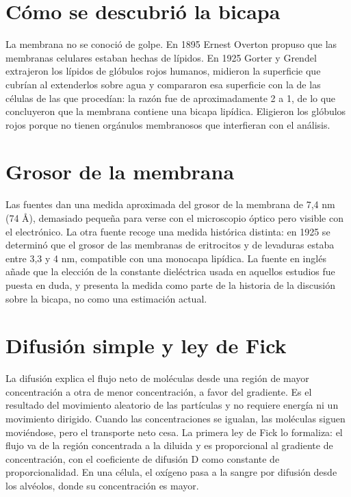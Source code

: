 \documentclass{book}
\begin{document}

\section{Cómo se descubrió la bicapa}

La membrana no se conoció de golpe. En 1895 Ernest Overton propuso que las membranas celulares estaban hechas de lípidos. En 1925 Gorter y Grendel extrajeron los lípidos de glóbulos rojos humanos, midieron la superficie que cubrían al extenderlos sobre agua y compararon esa superficie con la de las células de las que procedían: la razón fue de aproximadamente 2 a 1, de lo que concluyeron que la membrana contiene una bicapa lipídica. Eligieron los glóbulos rojos porque no tienen orgánulos membranosos que interfieran con el análisis.


\section{Grosor de la membrana}

Las fuentes dan una medida aproximada del grosor de la membrana de 7,4 nm (74 Å), demasiado pequeña para verse con el microscopio óptico pero visible con el electrónico. La otra fuente recoge una medida histórica distinta: en 1925 se determinó que el grosor de las membranas de eritrocitos y de levaduras estaba entre 3,3 y 4 nm, compatible con una monocapa lipídica. La fuente en inglés añade que la elección de la constante dieléctrica usada en aquellos estudios fue puesta en duda, y presenta la medida como parte de la historia de la discusión sobre la bicapa, no como una estimación actual.


\section{Difusión simple y ley de Fick}

La difusión explica el flujo neto de moléculas desde una región de mayor concentración a otra de menor concentración, a favor del gradiente. Es el resultado del movimiento aleatorio de las partículas y no requiere energía ni un movimiento dirigido. Cuando las concentraciones se igualan, las moléculas siguen moviéndose, pero el transporte neto cesa. La primera ley de Fick lo formaliza: el flujo va de la región concentrada a la diluida y es proporcional al gradiente de concentración, con el coeficiente de difusión D como constante de proporcionalidad. En una célula, el oxígeno pasa a la sangre por difusión desde los alvéolos, donde su concentración es mayor.
\end{document}
